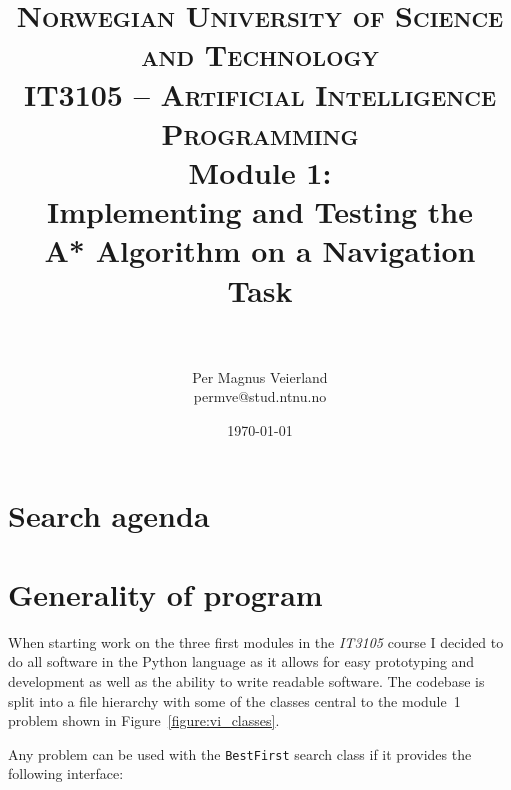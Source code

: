 

\title{
\normalfont \normalsize
\textsc{Norwegian University of Science and Technology\\IT3105 -- Artificial Intelligence Programming}
\horrule{0.5pt} \\[0.4cm]
\huge Module 1:\\Implementing and Testing the\\A* Algorithm on a Navigation Task\\
\horrule{2pt} \\[0.5cm]
}

\author{Per Magnus Veierland\\permve@stud.ntnu.no}

\date{\normalsize\today}



\maketitle

\newpage

\section*{Search agenda}

\section*{Generality of program}

When starting work on the three first modules in the \textit{IT3105} course I decided to do all software in the Python language as it allows for easy prototyping and development as well as the ability to write readable software. The codebase is split into a file hierarchy with some of the classes central to the module~1 problem shown in Figure~\ref{figure:vi_classes}.

Any problem can be used with the \texttt{BestFirst} search class if it provides the following interface:

